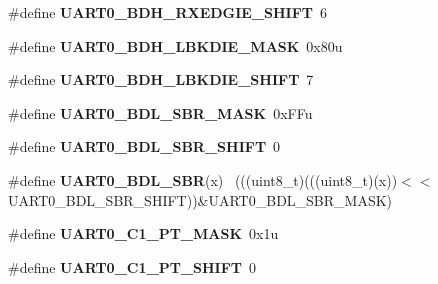 \begin{DoxyCompactItemize}
\item 
\hypertarget{group___u_a_r_t0___register___masks_gad8f5143553887979638377da46673dfc}{}\#define {\bfseries U\+A\+R\+T0\+\_\+\+B\+D\+H\+\_\+\+R\+X\+E\+D\+G\+I\+E\+\_\+\+S\+H\+I\+F\+T}~6\label{group___u_a_r_t0___register___masks_gad8f5143553887979638377da46673dfc}

\item 
\hypertarget{group___u_a_r_t0___register___masks_ga84132309b565d272671dde5d912a1611}{}\#define {\bfseries U\+A\+R\+T0\+\_\+\+B\+D\+H\+\_\+\+L\+B\+K\+D\+I\+E\+\_\+\+M\+A\+S\+K}~0x80u\label{group___u_a_r_t0___register___masks_ga84132309b565d272671dde5d912a1611}

\item 
\hypertarget{group___u_a_r_t0___register___masks_gae43cfa2facfc6b00c2a7b75ed410f407}{}\#define {\bfseries U\+A\+R\+T0\+\_\+\+B\+D\+H\+\_\+\+L\+B\+K\+D\+I\+E\+\_\+\+S\+H\+I\+F\+T}~7\label{group___u_a_r_t0___register___masks_gae43cfa2facfc6b00c2a7b75ed410f407}

\item 
\hypertarget{group___u_a_r_t0___register___masks_ga63fd23d0429a94909f330f711cccd226}{}\#define {\bfseries U\+A\+R\+T0\+\_\+\+B\+D\+L\+\_\+\+S\+B\+R\+\_\+\+M\+A\+S\+K}~0x\+F\+Fu\label{group___u_a_r_t0___register___masks_ga63fd23d0429a94909f330f711cccd226}

\item 
\hypertarget{group___u_a_r_t0___register___masks_gab076db54da38acfc6ba27dfa8431a8b2}{}\#define {\bfseries U\+A\+R\+T0\+\_\+\+B\+D\+L\+\_\+\+S\+B\+R\+\_\+\+S\+H\+I\+F\+T}~0\label{group___u_a_r_t0___register___masks_gab076db54da38acfc6ba27dfa8431a8b2}

\item 
\hypertarget{group___u_a_r_t0___register___masks_ga6eda626a36ea4a87cf4a09aec541cebf}{}\#define {\bfseries U\+A\+R\+T0\+\_\+\+B\+D\+L\+\_\+\+S\+B\+R}(x)                                              ~(((uint8\+\_\+t)(((uint8\+\_\+t)(x))$<$$<$U\+A\+R\+T0\+\_\+\+B\+D\+L\+\_\+\+S\+B\+R\+\_\+\+S\+H\+I\+F\+T))\&U\+A\+R\+T0\+\_\+\+B\+D\+L\+\_\+\+S\+B\+R\+\_\+\+M\+A\+S\+K)\label{group___u_a_r_t0___register___masks_ga6eda626a36ea4a87cf4a09aec541cebf}

\item 
\hypertarget{group___u_a_r_t0___register___masks_gaba11d4d0be5a31499a920b0d6904006d}{}\#define {\bfseries U\+A\+R\+T0\+\_\+\+C1\+\_\+\+P\+T\+\_\+\+M\+A\+S\+K}~0x1u\label{group___u_a_r_t0___register___masks_gaba11d4d0be5a31499a920b0d6904006d}

\item 
\hypertarget{group___u_a_r_t0___register___masks_ga0e72f6045ea89531d37017231952256b}{}\#define {\bfseries U\+A\+R\+T0\+\_\+\+C1\+\_\+\+P\+T\+\_\+\+S\+H\+I\+F\+T}~0\label{group___u_a_r_t0___register___masks_ga0e72f6045ea89531d37017231952256b}


\end{DoxyCompactItemize}
